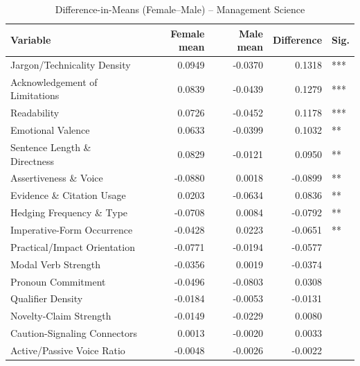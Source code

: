\begin{table}
\caption{Difference-in-Means (Female--Male) -- Management Science}
\label{tab:diff_means_MS}
\begin{tabular}{lrrrl}
\toprule
Variable & Female mean & Male mean & Difference & Sig. \\
\midrule
Jargon/Technicality Density & 0.0949 & -0.0370 & 0.1318 & *** \\
Acknowledgement of Limitations & 0.0839 & -0.0439 & 0.1279 & *** \\
Readability & 0.0726 & -0.0452 & 0.1178 & *** \\
Emotional Valence & 0.0633 & -0.0399 & 0.1032 & ** \\
Sentence Length \& Directness & 0.0829 & -0.0121 & 0.0950 & ** \\
Assertiveness \& Voice & -0.0880 & 0.0018 & -0.0899 & ** \\
Evidence \& Citation Usage & 0.0203 & -0.0634 & 0.0836 & ** \\
Hedging Frequency \& Type & -0.0708 & 0.0084 & -0.0792 & ** \\
Imperative-Form Occurrence & -0.0428 & 0.0223 & -0.0651 & ** \\
Practical/Impact Orientation & -0.0771 & -0.0194 & -0.0577 &  \\
Modal Verb Strength & -0.0356 & 0.0019 & -0.0374 &  \\
Pronoun Commitment & -0.0496 & -0.0803 & 0.0308 &  \\
Qualifier Density & -0.0184 & -0.0053 & -0.0131 &  \\
Novelty-Claim Strength & -0.0149 & -0.0229 & 0.0080 &  \\
Caution-Signaling Connectors & 0.0013 & -0.0020 & 0.0033 &  \\
Active/Passive Voice Ratio & -0.0048 & -0.0026 & -0.0022 &  \\
\bottomrule
\end{tabular}
\end{table}
